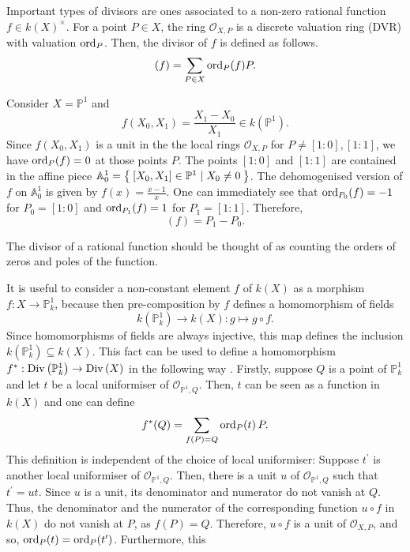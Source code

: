 Important types of divisors are ones associated to a non-zero rational
function $f\in k(X)^{\times}$. For a point $P\in X$, the ring
$\mathscr{O}_{X,P}$ is a discrete valuation ring (DVR) with valuation
$\operatorname{ord}_{P}$. Then, the divisor of $f$ is defined as follows.
\[
  (f) = \sum_{P\in X}\operatorname{ord}_{P}(f)P.
\]
\begin{ex}
  Consider $X=\mathbb{P}^{1}$ and
  \[f(X_{0}, X_{1})=\frac{X_{1}-X_{0}}{X_{1}}\in k(\mathbb{P}^{1}).\]
  Since $f(X_{0}, X_{1})$ is a unit in the the local rings
  $\mathscr{O}_{X,P}$ for $P\neq [1:0], [1:1]$, we have $\operatorname{ord}_{P}(f)=0$
  at those points $P$. The points $[1:0]$ and $[1:1]$ are contained in the
  affine piece $\mathbb{A}_{0}^{1}=\Set{[X_{0},X_{1}]\in\mathbb{P}^{1}\mid
    X_{0}\neq 0}$. The dehomogenised version of $f$ on $\mathbb{A}_{0}^{1}$ is
  given by $f(x)=\frac{x-1}x$. One can immediately see that
  $\operatorname{ord}_{P_{0}}(f)=-1$ for $P_{0}=[1:0]$ and $\operatorname{ord}_{P_{1}}(f)=1$ for
  $P_{1}=[1:1]$. Therefore,
  \[(f)=P_{1}-P_{0}.\]
\end{ex}
\begin{rem}
  The divisor of a rational function should be thought of as counting the
  orders of zeros and poles of the function.
\end{rem}
It is useful to consider a non-constant element $f$ of $k(X)$ as a morphism
$f:X\to\mathbb{P}^{1}_{k}$, because then pre-composition by $f$ defines a
homomorphism of fields
\[
  k\left(\mathbb{P}^1_k\right)\to k\left(X\right):g\mapsto g\circ f.
\]
Since homomorphisms of fields are always injective, this map
defines the inclusion $k\left(\mathbb{P}^{1}_{k}\right)\subseteq k\left(X\right)$.
This fact can be used to define a homomorphism
$f^{\ast}:\operatorname{Div}\left(\mathbb{P}^{1}_{k}\right)\to\operatorname{Div}\left(X\right)$ in the
following way \cite{hartshorne}. Firstly, suppose $Q$ is a point of
$\mathbb{P}^{1}_{k}$ and let $t$ be a local uniformiser of
$\mathscr{O}_{\mathbb{P}^{1},Q}$. Then, $t$ can be seen as a function in $k(X)$
and one can define
\[
  f^{\ast}(Q)=\sum_{f(P)=Q}\operatorname{ord}_{P}(t)\,P.
\]
This definition is independent of the choice of local uniformiser: Suppose
$t^{\prime}$ is another local uniformiser of $\mathscr{O}_{\mathbb{P}^{1},Q}$.
Then, there is a unit $u$ of $\mathscr{O}_{\mathbb{P}^1,Q}$ such that $t^{\prime}=ut$. 
Since $u$ is a unit, its denominator and numerator do not vanish at $Q$. Thus, 
the denominator and the numerator of the corresponding function $u\circ f$ in $k(X)$ 
do not vanish at $P$, as $f(P)=Q$. Therefore, $u\circ f$ is a unit of
$\mathscr{O}_{X,P}$, and so, $\operatorname{ord}_{P}(t)=\operatorname{ord}_{P}(t^{\prime})$. Furthermore, this

